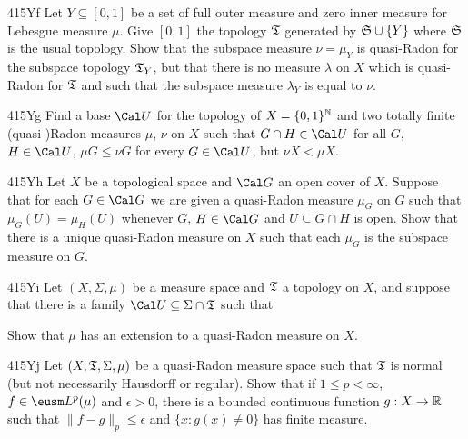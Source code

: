 {\spheader 415Yf Let $Y\subseteq[0,1]$ be a set of full outer measure and
zero inner measure for Lebesgue measure $\mu$.   Give $[0,1]$ the
topology $\frak T$ generated by $\frak S\cup\{Y\}$ where $\frak S$ is
the usual topology.    Show that the subspace measure $\nu=\mu_Y$ is
quasi-Radon for the subspace topology $\frak T_Y$, but that there is no
measure $\lambda$ on $X$ which is quasi-Radon for $\frak T$ and such
that the subspace measure $\lambda_Y$ is equal to $\nu$.

\spheader 415Yg Find a base $\Cal U$ for the topology of
$X=\{0,1\}^{\Bbb N}$ and two totally finite (quasi-\nobreak)Radon
measures
$\mu$, $\nu$ on $X$ such that $G\cap H\in\Cal U$ for all $G$,
$H\in\Cal U$, $\mu G\le\nu G$ for every $G\in\Cal U$, but $\nu X<\mu X$.

\spheader 415Yh Let $X$ be a topological space and $\Cal G$ an open
cover of $X$.   Suppose that for each $G\in\Cal G$ we are given a
quasi-Radon measure $\mu_G$ on $G$ such that $\mu_G(U)=\mu_H(U)$
whenever $G$, $H\in\Cal G$ and $U\subseteq G\cap H$ is open.   Show that
there is a unique quasi-Radon measure on $X$ such that each $\mu_G$ is
the subspace measure on $G$.   

\spheader 415Yi Let $(X,\Sigma,\mu)$ be a measure space and $\frak T$ a
topology on $X$, and suppose that there is a family
$\Cal U\subseteq\Sigma\cap\frak T$ such that


\noindent Show that $\mu$ has an extension to a quasi-Radon measure on $X$.

\spheader 415Yj Let $(X,\frak T,\Sigma,\mu)$ be a quasi-Radon measure
space such that $\frak T$ is normal (but not necessarily Hausdorff or
regular).   Show that if $1\le p<\infty$, $f\in\eusm L^p(\mu)$ and
$\epsilon>0$, there is a bounded continuous function $g:X\to\Bbb R$ such
that $\|f-g\|_p\le\epsilon$ and $\{x:g(x)\ne 0\}$ has finite measure.

}
